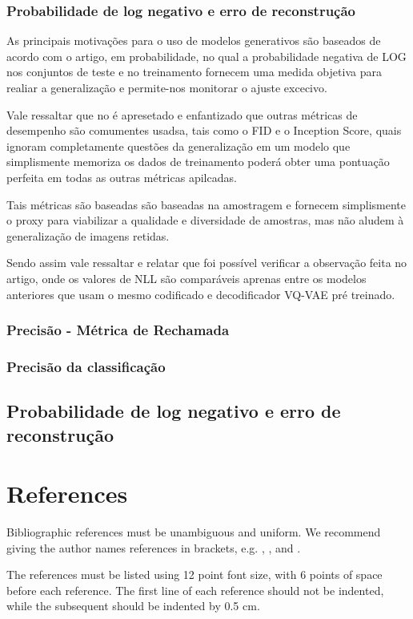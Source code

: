 \documentclass[12pt]{article}
\begin{document}
\subsubsection{Probabilidade de log negativo e erro de reconstrução}
As principais motivações para o uso de modelos generativos são baseados de acordo com o artigo, em probabilidade, no qual a probabilidade negativa de LOG nos conjuntos de teste e no treinamento fornecem uma medida objetiva para realiar a generalização e permite-nos monitorar o ajuste excecivo. 

Vale ressaltar que no é apresetado e enfantizado que outras métricas de desempenho são comumentes usadsa, tais como o FID e o Inception Score, quais ignoram completamente questões da generalização em um modelo que simplismente memoriza os dados de treinamento poderá obter uma pontuação perfeita em todas as outras métricas apilcadas. 

Tais métricas são baseadas são baseadas na amostragem e fornecem simplismente o proxy para viabilizar a qualidade e diversidade de amostras, mas não aludem à generalização de imagens retidas.

Sendo assim vale ressaltar e relatar que foi possível verificar a observação feita no artigo, onde os valores de NLL são comparáveis aprenas entre os modelos anteriores que usam o mesmo codificado e decodificador VQ-VAE pré treinado.
\subsubsection{Precisão - Métrica de Rechamada}
\subsubsection{Precisão da classificação}

\subsection{Probabilidade de log negativo e erro de reconstrução}



\section{References}

Bibliographic references must be unambiguous and uniform.  We recommend giving
the author names references in brackets, e.g. \cite{knuth:84},
\cite{boulic:91}, and \cite{smith:99}.

The references must be listed using 12 point font size, with 6 points of space
before each reference. The first line of each reference should not be
indented, while the subsequent should be indented by 0.5 cm.



\end{document}
